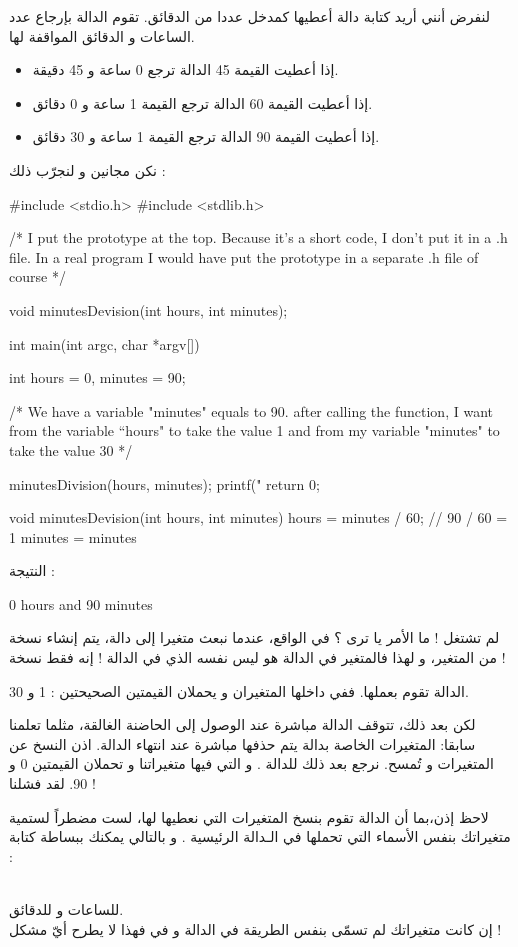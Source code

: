 لنفرض أنني أريد كتابة دالة أعطيها كمدخل عددا من الدقائق. تقوم الدالة بإرجاع عدد الساعات و الدقائق المواقفة لها.
\begin{itemize}
  \item إذا أعطيت القيمة 45  الدالة ترجع 0 ساعة و 45 دقيقة.
  \item إذا أعطيت القيمة 60 الدالة ترجع القيمة  1 ساعة و 0 دقائق.
	\item إذا أعطيت القيمة 90 الدالة ترجع القيمة  1 ساعة و 30 دقائق.
\end{itemize}
نكن مجانين و لنجرّب ذلك :
\begin{Csource}
#include <stdio.h>
#include <stdlib.h>

/* I put the prototype at the top.
Because it's a short code, I don't put it in a .h file.
In a real program I would have put the prototype
in a separate .h file of course */

void minutesDevision(int hours, int minutes);

int main(int argc, char *argv[])
{
	int hours = 0, minutes = 90;

/* We have a variable "minutes" equals to 90.
   after calling the function, I want from the variable
“hours" to take the value 1 and from my variable
"minutes" to take the value 30 */

	minutesDivision(hours, minutes);
	printf("%
	return 0;
}

void minutesDevision(int hours, int minutes)
{
	hours = minutes / 60;  // 90 / 60 = 1
	minutes = minutes %
}
\end{Csource}
النتيجة :
\begin{Console}
0 hours and 90 minutes
\end{Console}
لم تشتغل ! ما الأمر يا ترى ؟
في الواقع، عندما نبعث متغيرا إلى دالة، يتم إنشاء نسخة من المتغير، و لهذا فالمتغير
في الدالة
هو ليس نفسه الذي في الدالة
 !
إنه فقط نسخة !

الدالة
تقوم بعملها. ففي داخلها المتغيران
و
يحملان القيمتين الصحيحتين : 1 و 30.

لكن بعد ذلك، تتوقف الدالة مباشرة عند الوصول إلى الحاضنة الغالقة، مثلما تعلمنا سابقا: المتغيرات الخاصة بدالة يتم حذفها مباشرة عند انتهاء الدالة. اذن النسخ عن المتغيرات
و
تُمسح.
نرجع بعد ذلك للدالة
.
و التي فيها متغيراتنا
و
تحملان القيمتين 0 و 90. لقد فشلنا !
\begin{information}
	لاحظ إذن،بما أن الدالة تقوم بنسخ المتغيرات التي نعطيها لها، لست مضطراً لستمية متغيراتك بنفس الأسماء التي تحملها في الـدالة الرئيسية
.
و بالتالي يمكنك ببساطة كتابة :

\\
للساعات و
للدقائق.\\
إن كانت متغيراتك لم تسمّى بنفس الطريقة في الدالة و في
فهذا لا يطرح أيّ مشكل !
\end{information}


